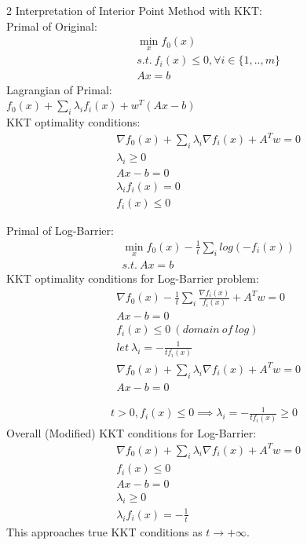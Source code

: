 \documentclass[8pt]{extarticle}
\newcommand{\set}[1]{\{#1\}}
\begin{document}
\begin{multicols*}{2}
  Interpretation of Interior Point Method with KKT:\\
  Primal of Original:
  \begin{align*}
    &\min_x f_0(x)\\
    &s.t.\ f_i(x) \leq 0, \forall i\in\set{1,..,m}\\
    & Ax = b
  \end{align*}
  Lagrangian of Primal:\\
  $f_0(x) + \sum_i \lambda_i f_i(x) + w^T(Ax-b)$\\
  KKT optimality conditions:
  \begin{align*}
    &\nabla f_0(x) + \sum_i \lambda_i \nabla f_i(x) + A^T w = 0\\
    &\lambda_i \geq 0\\
    &Ax-b = 0\\
    &\lambda_i f_i(x) = 0\\
    &f_i(x) \leq 0
  \end{align*}

  Primal of Log-Barrier:
  \begin{align*}
    &\min_x f_0(x) - \frac{1}{t} \sum_i log(-f_i(x))\\
    & s.t.\ Ax = b
  \end{align*}
  KKT optimality conditions for Log-Barrier problem:
  \begin{align*}
    &\nabla f_0(x) - \frac{1}{t} \sum_i \frac{\nabla f_i(x)}{f_i(x)} + A^T w = 0\\
    &Ax - b = 0\\
    &f_i(x) \leq  0\ (domain\ of\ log)\\
    &let\ \lambda_i = -\frac{1}{t f_i(x)}\\
    &\nabla f_0(x) + \sum_i \lambda_i \nabla f_i(x) + A^T w = 0\\
    &Ax - b = 0
  \end{align*}
  \vfill\null
  \columnbreak
  
  \begin{align*}
    t > 0, f_i(x) \leq 0 \implies \lambda_i = -\frac{1}{t f_i(x)} \geq 0
  \end{align*}
  Overall (Modified) KKT conditions for Log-Barrier:
  \begin{align*}
    &\nabla f_0(x) + \sum_i \lambda_i \nabla f_i(x) + A^T w = 0\\
    &f_i(x) \leq  0\\
    &Ax - b = 0\\
    &\lambda_i \geq 0\\
    &\lambda_i f_i(x) = -\frac{1}{t}
  \end{align*}
  This approaches true KKT conditions as $t\to +\infty$.
  \vfill\null
  \pagebreak


\end{multicols*}
\end{document}
